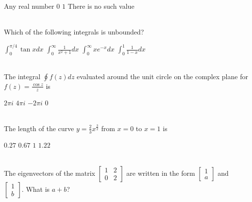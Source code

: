 \documentclass[addpoints,11pt]{exam}
\begin{document}
\begin{questions}
        \begin{oneparchoices}
            \choice Any real number
            \choice $0$
            \choice $1$
            \choice There is no such value
        \end{oneparchoices}\\
        \question Which of the following integrals is unbounded?\\

        \begin{oneparchoices}
            \choice $\int_{0}^{\pi/4}{\tan x dx}$
            \choice $\int_{0}^{\infty}{\frac{1}{x^2+1} dx}$
            \choice $\int_{0}^{\infty}{xe^{-x} dx}$
            \choice $\int_{0}^{1}{\frac{1}{1-x} dx}$
        \end{oneparchoices}\\

        \question The integral $\oint{f(z)dz}$ evaluated around the unit circle on the complex plane for $f(z) = \frac{\cos z}{z}$ is\\

        \begin{oneparchoices}
            \choice $2\pi i$
            \choice $4\pi i$
            \choice $-2\pi i$
            \choice $0$
        \end{oneparchoices}\\
        
        \question The length of the curve $y=\frac{2}{3}x^{\frac{3}{2}}$ from $x=0$ to $x=1$ is\\
        
        \begin{oneparchoices}
            \choice $0.27$
            \choice $0.67$
            \choice $1$
            \choice $1.22$
        \end{oneparchoices}\\
        
        \question The eigenvectors of the matrix $\begin{bmatrix}
            1 & 2 \\
            0 & 2
        \end{bmatrix}$ are written in the form $\begin{bmatrix}
            1 \\
            a
        \end{bmatrix}$ and $\begin{bmatrix}
            1 \\b
        \end{bmatrix}$. What is $a+b$?
        

\end{questions}
\end{document}
